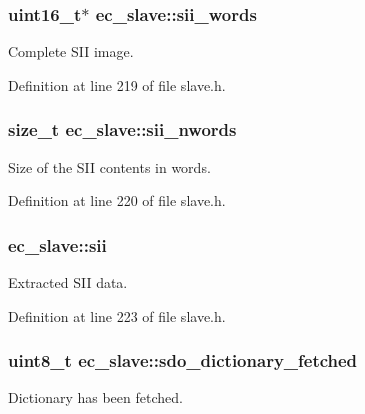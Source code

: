 \subsubsection[{sii\-\_\-words}]{\setlength{\rightskip}{0pt plus 5cm}uint16\-\_\-t$\ast$ {\bf ec\-\_\-slave\-::sii\-\_\-words}}\label{structec__slave_a3886920f38a9b5a97c1d50f3c08e989a}


\-Complete \-S\-I\-I image. 



\-Definition at line 219 of file slave.\-h.

\subsubsection[{sii\-\_\-nwords}]{\setlength{\rightskip}{0pt plus 5cm}size\-\_\-t {\bf ec\-\_\-slave\-::sii\-\_\-nwords}}\label{structec__slave_a9b6ee3261f586d6c30647b1494da0f57}


\-Size of the \-S\-I\-I contents in words. 



\-Definition at line 220 of file slave.\-h.

\subsubsection[{sii}]{ {\bf ec\-\_\-slave\-::sii}}\label{structec__slave_a081433f5a30f9352fbc4363093ae1e16}


\-Extracted \-S\-I\-I data. 



\-Definition at line 223 of file slave.\-h.

\subsubsection[{sdo\-\_\-dictionary\-\_\-fetched}]{\setlength{\rightskip}{0pt plus 5cm}uint8\-\_\-t {\bf ec\-\_\-slave\-::sdo\-\_\-dictionary\-\_\-fetched}}\label{structec__slave_a94732ef500405ce3afa15f6aeef4918d}


\-Dictionary has been fetched. 



